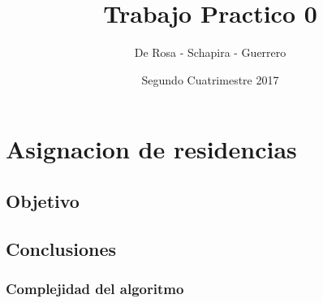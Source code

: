 \documentclass{article}
\title{Trabajo Practico 0}
\author{De Rosa - Schapira - Guerrero}
\date{Segundo Cuatrimestre 2017}
\begin{document}
    \maketitle
    \newpage
    \tableofcontents
    \newpage

    \section{Asignacion de residencias}
        \subsection{Objetivo}

        \subsection{Conclusiones}
            \subsubsection{Complejidad del algoritmo}
              
\end{document}
